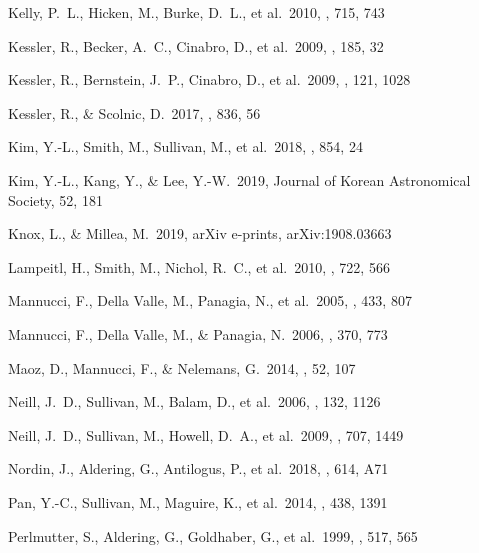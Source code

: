 \documentclass[]{aa}
\begin{document}
\begin{thebibliography}{}

 Kelly, P.~L., Hicken, M., Burke, D.~L.,
et al.\ 2010, \apj, 715, 743

 Kessler, R., Becker, A.~C., Cinabro,
D., et al.\ 2009, \apjs, 185, 32

 Kessler, R., Bernstein, J.~P., Cinabro,
D., et al.\ 2009, \pasp, 121, 1028

 Kessler, R., \& Scolnic, D.\
2017, \apj, 836, 56

 Kim, Y.-L., Smith, M., Sullivan, M., et al.\
2018, \apj, 854, 24

 Kim, Y.-L., Kang, Y., \& Lee, Y.-W.\ 2019,
Journal of Korean Astronomical Society, 52, 181

 Knox, L., \& Millea, M.\ 2019, arXiv
e-prints, arXiv:1908.03663


 Lampeitl, H., Smith, M., Nichol,
R.~C., et al.\ 2010, \apj, 722, 566


 Mannucci, F., Della Valle, M.,
Panagia, N., et al.\ 2005, \aap, 433, 807 

 Mannucci, F., Della Valle, M., \&
Panagia, N.\ 2006, \mnras, 370, 773 

 Maoz, D., Mannucci, F., \&
Nelemans, G.\ 2014, \araa, 52, 107 



 Neill, J.~D., Sullivan, M., Balam, D.,
et al.\ 2006, \aj, 132, 1126

 Neill, J.~D., Sullivan, M., Howell,
D.~A., et al.\ 2009, \apj, 707, 1449

 Nordin, J., Aldering, G., Antilogus,
P., et al.\ 2018, \aap, 614, A71


 Pan, Y.-C., Sullivan, M., Maguire, K., et
al.\ 2014, \mnras, 438, 1391

 Perlmutter, S., Aldering, G.,
Goldhaber, G., et al.\ 1999, \apj, 517, 565


\end{thebibliography}
\end{document}
